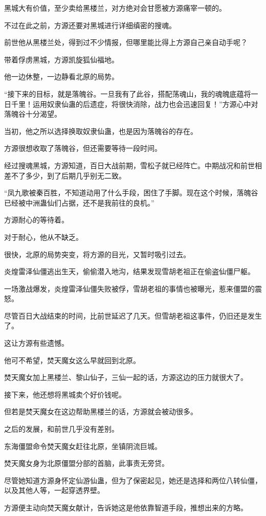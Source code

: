 \begin{this_body}
黑城大有价值，至少卖给黑楼兰，对方绝对会甘愿被方源痛宰一顿的。

不过在此之前，方源还要对黑城进行详细缜密的搜魂。

前世他从黑楼兰处，得到过不少情报，但哪里能比得上方源自己亲自动手呢？

带着俘虏黑城，方源凯旋狐仙福地。

他一边休整，一边静看北原的局势。

“接下来的目标，就是落魄谷。一旦我有了此谷，搭配荡魂山，我的魂魄底蕴将一日千里！运用奴隶仙蛊的后遗症，将很快消除，战力也会迅速回复！”方源心中对落魄谷十分渴望。

当初，他之所以选择换取奴隶仙蛊，也是因为落魄谷的存在。

方源很想收取了落魄谷，但还需要等待一段时间。

经过搜魂黑城，方源知道，百日大战前期，雪松子就已经阵亡。中期战况和前世相差不了多少，到了后期几乎别无二致。

“凤九歌被秦百胜，不知道动用了什么手段，困住了手脚。现在这个时候，落魄谷已经被中洲蛊仙们占据，还不是我前往的良机。”

方源耐心的等待着。

对于耐心，他从不缺乏。

很快，北原的局势突变，将方源的目光，又暂时吸引过去。

炎煌雷泽仙僵逃出生天，偷偷潜入地沟，结果发现雪胡老祖正在偷盗仙僵尸躯。

一场激战爆发，炎煌雷泽仙僵失败被俘，雪胡老祖的事情也被曝光，惹来僵盟的震怒。

尽管百日大战结束的时间，比前世延迟了几天。但雪胡老祖这事件，仍旧还是发生了。

这让方源有些遗憾。

他可不希望，焚天魔女这么早就回到北原。

焚天魔女加上黑楼兰、黎山仙子，三仙一起的话，方源这边的压力就很大了。

接下来，他还想将黑城卖个好价钱呢。

但若是焚天魔女在这边帮助黑楼兰的话，方源就会被动很多。

之后的发展，和前世几乎没有差别。

东海僵盟命令焚天魔女赶往北原，坐镇阴流巨城。

焚天魔女身为北原僵盟分部的首脑，此事责无旁贷。

尽管她知道方源身怀定仙游仙蛊，但为了保密起见，她还是选择和两位八转仙僵，以及其他人等，一起穿透界壁。

方源便主动向焚天魔女献计，告诉她这是他依靠智道手段，推想出来的方略。


\end{this_body}
